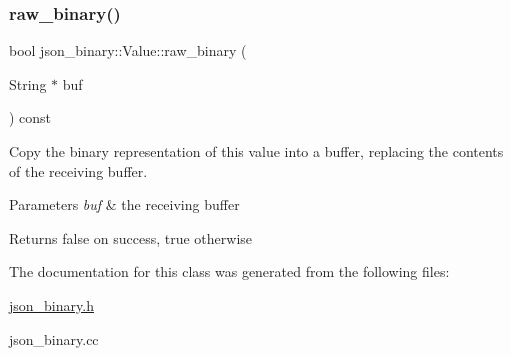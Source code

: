 \subsubsection{\texorpdfstring{raw\+\_\+binary()}{raw\_binary()}}
{\footnotesize\ttfamily bool json\+\_\+binary\+::\+Value\+::raw\+\_\+binary (\begin{DoxyParamCaption}\item[{String $\ast$}]{buf }\end{DoxyParamCaption}) const}

Copy the binary representation of this value into a buffer, replacing the contents of the receiving buffer.


\begin{DoxyParams}{Parameters}
{\em buf} & the receiving buffer \\
\hline
\end{DoxyParams}
\begin{DoxyReturn}{Returns}
false on success, true otherwise 
\end{DoxyReturn}


The documentation for this class was generated from the following files\+:\begin{DoxyCompactItemize}
\item 
\mbox{\hyperlink{json__binary_8h}{json\+\_\+binary.\+h}}\item 
json\+\_\+binary.\+cc\end{DoxyCompactItemize}
